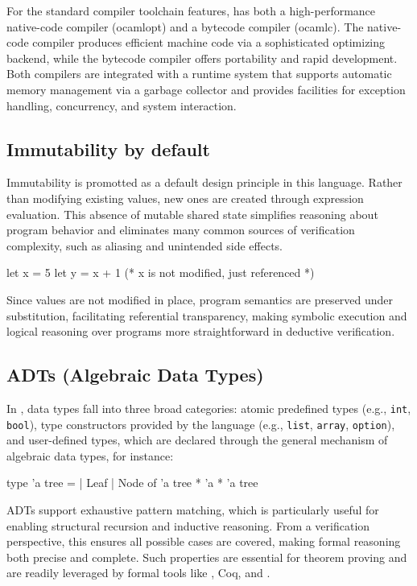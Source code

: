 For the standard compiler toolchain features, \ocaml has both a high-performance native-code compiler (\textsf{ocamlopt}) and a 
bytecode compiler (\textsf{ocamlc}). The native-code compiler produces efficient machine code via a sophisticated optimizing 
backend, while the bytecode compiler offers portability and rapid development. Both compilers are integrated with a runtime 
system that supports automatic memory management via a garbage collector and provides facilities for exception handling, 
concurrency, and system interaction.

\subsection{Immutability by default}

Immutability is promotted as a default design principle in this language. Rather than modifying existing values, new ones 
are created through expression evaluation. This absence of mutable shared state simplifies reasoning about program behavior 
and eliminates many common sources of verification complexity, such as aliasing and unintended side effects.

\begin{ocamlenv}
  let x = 5
  let y = x + 1 (* x is not modified, just referenced *)
\end{ocamlenv}

Since values are not modified in place, program semantics are preserved under substitution, facilitating referential transparency, 
making symbolic execution and logical reasoning over programs more straightforward in deductive verification.

\subsection{ADTs (Algebraic Data Types)}

In \ocaml, data types fall into three broad categories: atomic predefined types (e.g., \texttt{int}, \texttt{bool}), type 
constructors provided by the language (e.g., \texttt{list}, \texttt{array}, \texttt{option}), and user-defined types, which 
are declared through the general mechanism of algebraic data types, for instance:

\begin{ocamlenv}
  type 'a tree =
    | Leaf
    | Node of 'a tree * 'a * 'a tree
\end{ocamlenv}

ADTs support exhaustive pattern matching, which is particularly useful for enabling structural recursion and inductive reasoning.
From a verification perspective, this ensures all possible cases are covered, making formal reasoning both precise and complete. 
Such properties are essential for theorem proving and are readily leveraged by formal tools like \gospel, Coq, and \whythree.

